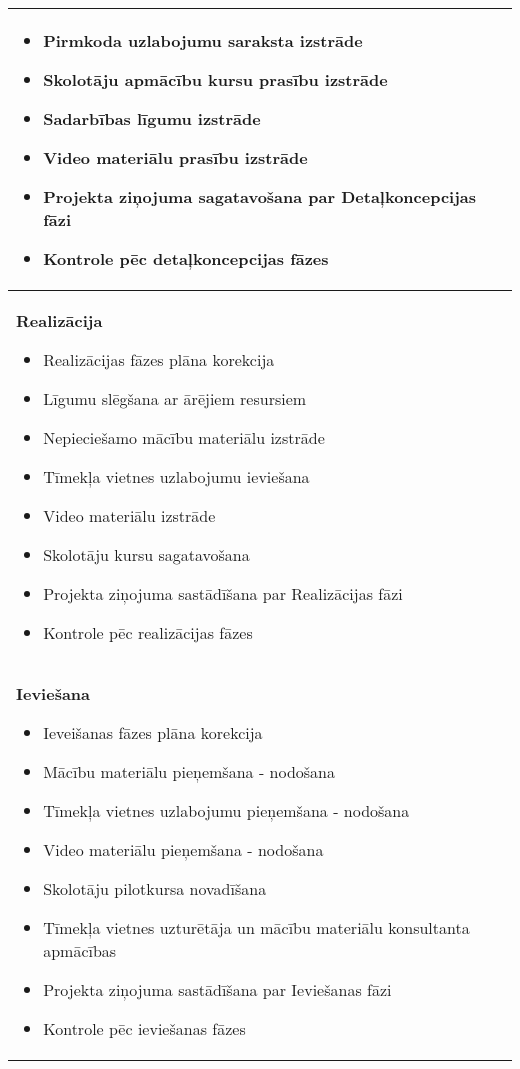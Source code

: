 \begin{longtable}{|p{}|}
\begin{itemize}
          \item Pirmkoda uzlabojumu saraksta izstrāde
          \item Skolotāju apmācību kursu prasību izstrāde
          \item Sadarbības līgumu izstrāde
          \item Video materiālu prasību izstrāde
          \item Projekta ziņojuma sagatavošana par Detaļkoncepcijas fāzi
          \item Kontrole pēc detaļkoncepcijas fāzes
        \end{itemize}\\
      \hline
        \textbf{Realizācija}
        \begin{itemize}
          \item Realizācijas fāzes plāna korekcija
          \item Līgumu slēgšana ar ārējiem resursiem
          \item Nepieciešamo mācību materiālu izstrāde
          \item Tīmekļa vietnes uzlabojumu ieviešana
          \item Video materiālu izstrāde
          \item Skolotāju kursu sagatavošana
          \item Projekta ziņojuma sastādīšana par Realizācijas fāzi
          \item Kontrole pēc realizācijas fāzes
        \end{itemize}\\
      \hline
        \textbf{Ieviešana}
        \begin{itemize}
          \item Ieveišanas fāzes plāna korekcija
          \item Mācību materiālu pieņemšana - nodošana
          \item Tīmekļa vietnes uzlabojumu pieņemšana - nodošana
          \item Video materiālu pieņemšana - nodošana
          \item Skolotāju pilotkursa novadīšana
          \item Tīmekļa vietnes  uzturētāja un mācību materiālu konsultanta apmācības
          \item Projekta ziņojuma sastādīšana par Ieviešanas fāzi
          \item Kontrole pēc ieviešanas fāzes          
        \end{itemize}\\

\end{longtable}
